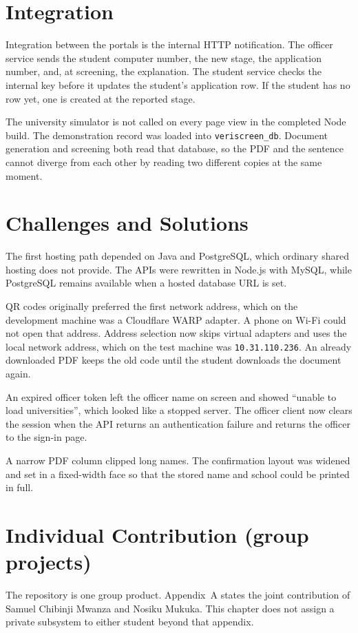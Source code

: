 \documentclass[12pt,a4paper]{report}
\begin{document}
\section{Integration}
Integration between the portals is the internal HTTP notification. The officer service sends the student computer number, the new stage, the application number, and, at screening, the explanation. The student service checks the internal key before it updates the student's application row. If the student has no row yet, one is created at the reported stage.

The university simulator is not called on every page view in the completed Node build. The demonstration record was loaded into \texttt{veriscreen\_db}. Document generation and screening both read that database, so the PDF and the sentence cannot diverge from each other by reading two different copies at the same moment.

\section{Challenges and Solutions}
The first hosting path depended on Java and PostgreSQL, which ordinary shared hosting does not provide. The APIs were rewritten in Node.js with MySQL, while PostgreSQL remains available when a hosted database URL is set.

QR codes originally preferred the first network address, which on the development machine was a Cloudflare WARP adapter. A phone on Wi-Fi could not open that address. Address selection now skips virtual adapters and uses the local network address, which on the test machine was \texttt{10.31.110.236}. An already downloaded PDF keeps the old code until the student downloads the document again.

An expired officer token left the officer name on screen and showed ``unable to load universities'', which looked like a stopped server. The officer client now clears the session when the API returns an authentication failure and returns the officer to the sign-in page.

A narrow PDF column clipped long names. The confirmation layout was widened and set in a fixed-width face so that the stored name and school could be printed in full.

\section{Individual Contribution (group projects)}
The repository is one group product. Appendix~A states the joint contribution of Samuel Chibinji Mwanza and Nosiku Mukuka. This chapter does not assign a private subsystem to either student beyond that appendix.
\end{document}
